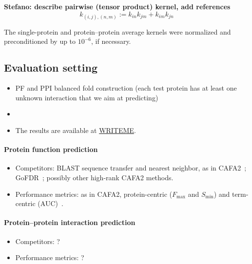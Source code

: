 \documentclass{bioinfo}
\newcommand{\stefano}[1]{{\bf \textcolor{alizarin}{{Stefano: #1}}}}
\begin{document}
\stefano{describe pairwise (tensor product) kernel, add references}
%
$$ k_{(i,j),(n,m)} := k_{in}k_{jm} + k_{im}k_{jn} $$

The single-protein and protein--protein average kernels were normalized and
preconditioned by up to $10^{-6}$, if necessary.

\subsection{Evaluation setting}

\begin{itemize}

    \item PF and PPI balanced fold construction (each test protein has
    at least one unknown interaction that we aim at predicting)

    \item \cite{park2012flaws}

    \item The results are available at \url{WRITEME}.

\end{itemize}

\paragraph{Protein function prediction}

\begin{itemize}

    \item Competitors: BLAST sequence transfer and nearest neighbor, as in
    CAFA2~\cite{jiang2016cafa2}; GoFDR~\cite{gong2016gofdr}; possibly other high-rank CAFA2 methods.

    \item Performance metrics: as in CAFA2, protein-centric ($F_\text{max}$ and $S_\text{min}$)
    and term-centric (AUC)~\cite{jiang2016cafa2}.

\end{itemize}

\paragraph{Protein--protein interaction prediction}

\begin{itemize}

    \item Competitors: ?

    \item Performance metrics: ?

\end{itemize}
\end{document}
